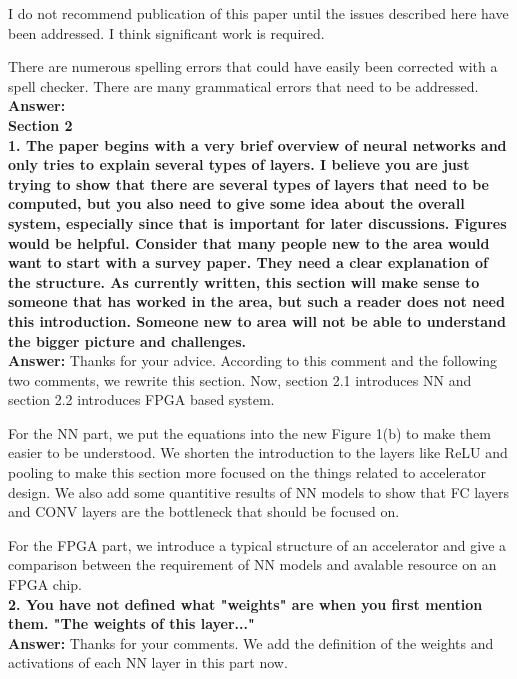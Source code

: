 \documentclass[12pt]{paper}
\newcommand{\rev}[1]{{{\color[rgb]{0,0,1}{#1}}}}
\newcommand{\answer}[1]{\noindent\textbf{Answer:} #1}
\newcommand{\comment}[1]{\noindent\textbf{#1}\\}
\begin{document}
I do not recommend publication of this paper until the issues described here have been addressed. I think significant work is required.

There are numerous spelling errors that could have easily been corrected with a spell checker.  There are many grammatical errors that need to be addressed.\\

\answer{}\\


{\noindent\textbf{Section 2}}\\

\comment{1. The paper begins with a very brief overview of neural networks and only tries to explain several types of layers. I believe you are just trying to show that there are several types of layers that need to be computed, but you also need to give some idea about the overall system, especially since that is important for later discussions. Figures would be helpful. Consider that many people new to the area would want to start with a survey paper. They need a clear explanation of the structure. As currently written, this section will make sense to someone that has worked in the area, but such a reader does not need this introduction. Someone new to area will not be able to understand the bigger picture and challenges.}

\answer{Thanks for your advice. According to this comment and the following two comments, we rewrite this section. Now, section 2.1 introduces NN and section 2.2 introduces FPGA based system. 

For the NN part, we put the equations into the new Figure 1(b) to make them easier to be understood. We shorten the introduction to the layers like ReLU and pooling to make this section more focused on the things related to accelerator design. We also add some quantitive results of NN models to show that FC layers and CONV layers are the bottleneck that should be focused on.

For the FPGA part, we introduce a typical structure of an accelerator and give a comparison between the requirement of NN models and avalable resource on an FPGA chip. }\\

\comment{2. You have not defined what "weights" are when you first mention them.  "The weights of this layer..."}

\answer{Thanks for your comments. We add the definition of the weights and activations of each NN layer in this part now. \\

\rev{We refer the parameter of each layer as weights and the input/output of each layer as activations through this paper.}}\\
\end{document}

